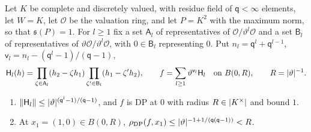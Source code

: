 \begin{example}[the drop with $R\in\abs{K^\times}$ and $\mathfrak s(P)=1$]\label{dp:ex:radius-drop-b}
Let $K$ be complete and discretely valued, with residue field of $\mathsf q<\infty$ elements, let $W=K$, let $\mathcal O$ be the valuation ring, and let $P=K^2$ with the maximum norm, so that $\mathfrak s(P)=1$. For $l\ge1$ fix a set $\mathsf A_l$ of representatives of $\mathcal O/\vartheta^l\mathcal O$ and a set $\mathsf B_l$ of representatives of $\vartheta\mathcal O/\vartheta^l\mathcal O$, with $0\in\mathsf B_l$ representing $0$. Put $n_l=\mathsf q^l+\mathsf q^{l-1}$, $\mathsf v_l=n_l-(\mathsf q^l-1)/(\mathsf q-1)$,
\[
 \mathsf H_l(h)=\prod_{\zeta\in\mathsf A_l}(h_2-\zeta h_1)\prod_{\zeta'\in\mathsf B_l}(h_1-\zeta'h_2),\qquad f=\sum_{l\ge1}\vartheta^{\mathsf v_l}\mathsf H_l\quad\text{on }B(0,R),\qquad R=\lvert \vartheta\rvert^{-1}.
\]
\begin{enumerate}
\item $\lVert \mathsf H_l\rVert\le\lvert \vartheta\rvert^{(\mathsf q^l-1)/(\mathsf q-1)}$, and $f$ is DP at $0$ with radius $R\in\abs{K^\times}$ and bound $1$.
\item At $x_1=(1,0)\in B(0,R)$, $\rho_{\mathrm{DP}}(f,x_1)\le\lvert \vartheta\rvert^{-1+1/(\mathsf q(\mathsf q-1))}<R$.
\end{enumerate}
\end{example}


